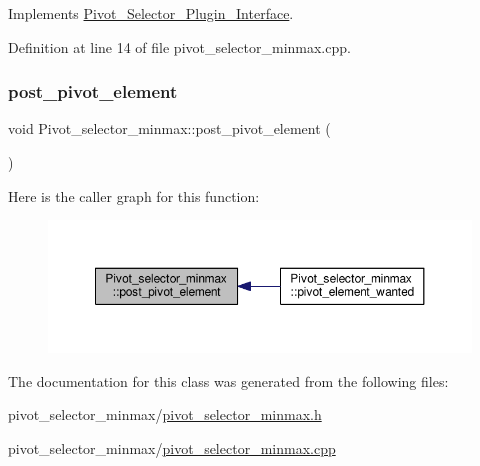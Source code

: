 Implements \hyperlink{classPivot__Selector__Plugin__Interface_a79edca6930746a137a95a26239f7af5e}{Pivot\+\_\+\+Selector\+\_\+\+Plugin\+\_\+\+Interface}.



Definition at line 14 of file pivot\+\_\+selector\+\_\+minmax.\+cpp.

\mbox{\label{classPivot__selector__minmax_a7e91c9552fdb57e1f09c525b0071d5cc}} 
\subsubsection{\texorpdfstring{post\+\_\+pivot\+\_\+element}{post\_pivot\_element}}
{\footnotesize\ttfamily void Pivot\+\_\+selector\+\_\+minmax\+::post\+\_\+pivot\+\_\+element (\begin{DoxyParamCaption}\item[{Q\+Model\+Index}]{ }\end{DoxyParamCaption})\hspace{0.3cm}{\ttfamily [signal]}}

Here is the caller graph for this function\+:\nopagebreak
\begin{figure}[H]
\begin{center}
\leavevmode
\includegraphics[width=350pt]{classPivot__selector__minmax_a7e91c9552fdb57e1f09c525b0071d5cc_icgraph}
\end{center}
\end{figure}


The documentation for this class was generated from the following files\+:\begin{DoxyCompactItemize}
\item 
pivot\+\_\+selector\+\_\+minmax/\hyperlink{pivot__selector__minmax_8h}{pivot\+\_\+selector\+\_\+minmax.\+h}\item 
pivot\+\_\+selector\+\_\+minmax/\hyperlink{pivot__selector__minmax_8cpp}{pivot\+\_\+selector\+\_\+minmax.\+cpp}\end{DoxyCompactItemize}
